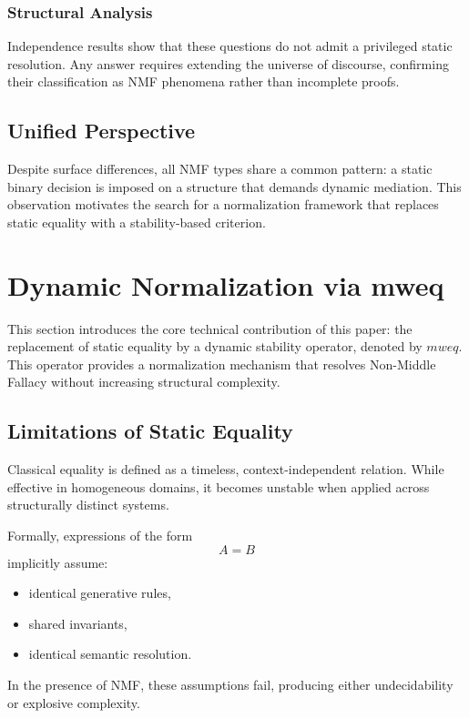 \documentclass[11pt]{article}
\begin{document}
\subsubsection{Structural Analysis}

Independence results show that these questions do not admit a
privileged static resolution.
Any answer requires extending the universe of discourse, confirming
their classification as NMF phenomena rather than incomplete proofs.

\subsection{Unified Perspective}

Despite surface differences, all NMF types share a common pattern:
a static binary decision is imposed on a structure that demands
dynamic mediation.
This observation motivates the search for a normalization framework
that replaces static equality with a stability-based criterion.


\section{Dynamic Normalization via mweq}

This section introduces the core technical contribution of this paper:
the replacement of static equality by a dynamic stability operator,
denoted by $mweq$.
This operator provides a normalization mechanism that resolves
Non-Middle Fallacy without increasing structural complexity.

\subsection{Limitations of Static Equality}

Classical equality is defined as a timeless, context-independent
relation.
While effective in homogeneous domains, it becomes unstable when
applied across structurally distinct systems.

Formally, expressions of the form
\[
A = B
\]
implicitly assume:
\begin{itemize}
  \item identical generative rules,
  \item shared invariants,
  \item identical semantic resolution.
\end{itemize}

In the presence of NMF, these assumptions fail, producing either
undecidability or explosive complexity.
\end{document}
